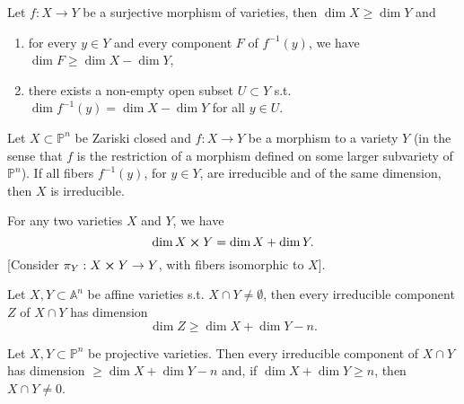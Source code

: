 \begin{thm}
	Let $f: X \to Y$ be a surjective morphism of varieties, then
	$\dim X \geq \dim Y$ and
	\begin{enumerate}
		\item for every $y \in Y$ and every component $F$ of $f^{-1}(y)$,
			we have $\dim F \geq \dim X - \dim Y$,
		\item there exists a non-empty open subset $U \subset Y$
			s.t. $\dim f^{-1}(y) = \dim X - \dim Y$ for all $y \in U$.
	\end{enumerate}
\end{thm}

\begin{cor}
	Let $X \subset \mathbb{P}^{n}$ be Zariski closed and
	$f: X \to Y$ be a morphism to a variety $Y$ (in the sense that
	$f$ is the restriction of a morphism defined on some larger subvariety of $\mathbb{P}^{n}$).
	If all fibers $f^{-1}(y)$, for $y \in Y$, are irreducible and of the same dimension, 
	then $X$ is irreducible.
\end{cor} 

\begin{cor}
	For any two varieties $X$ and $Y$, we have
	\begin{equation}
	\dim X \cross Y = \dim X + \dim Y
	.\end{equation} 
	[Consider $\pi_Y: X \cross Y \to Y$, with fibers isomorphic to $X$].
\end{cor} 

\begin{cor}
	Let $X, Y \subset \mathbb{A}^{n}$ be affine varieties s.t. $X \cap Y \neq \emptyset$,
	then every irreducible component $Z$ of $X \cap Y$ has dimension
	\begin{equation}
	\dim Z \geq \dim X + \dim Y - n
	.\end{equation} 
\end{cor} 

\begin{cor}
	Let $X, Y \subset \mathbb{P}^{n}$ be projective varieties.
	Then every irreducible component of $X \cap Y$ has dimension 
	$\geq \dim X + \dim Y - n$ and, if $\dim X + \dim Y \geq n$, then
	$X \cap Y \neq 0$.
\end{cor} 


